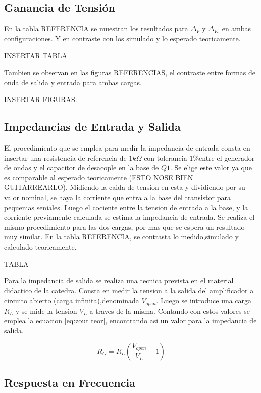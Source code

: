 \subsection{Ganancia de Tensión}

En la tabla REFERENCIA se muestran los resultados para $\Delta_V$ y $\Delta_{Vs}$ en ambas configuraciones. Y en contraste con los simulado y lo esperado teoricamente.

INSERTAR TABLA 

Tambien se observan en las figuras REFERENCIAS, el contraste entre formas de onda de salida y entrada para ambas cargas.

INSERTAR FIGURAS.

\subsection{Impedancias de Entrada y Salida}

El procedimiento que se emplea para medir la impedancia de entrada consta en insertar una resistencia de referencia de $1 k\Omega$ con tolerancia $1\%$entre el generador de ondas y el capacitor de desacople en la base de $Q1$. Se elige este valor ya que es comparable al esperado teoricamente (ESTO NOSE BIEN GUITARREARLO).
Midiendo la caida de tension en esta y dividiendo por su valor nominal, se haya la corriente que entra a la base del transistor para pequenias seniales. Luego el cociente entre la tension de entrada a la base, y la corriente previamente calculada se estima la impedancia de entrada.
Se realiza el mismo procedimiento para las dos cargas, por mas que se espera un resultado muy similar. En la tabla REFERENCIA, se contrasta lo medido,simulado y calculado teoricamente.

TABLA  

Para la impedancia de salida se realiza una tecnica prevista en el material didactico de la catedra. Consta en medir la tension a la salida del amplificador a circuito abierto (carga infinita),denominada $V_{open}$. Luego se introduce una carga $R_L$ y se mide la tension $V_L$ a traves de la misma.
Contando con estos valores se emplea la ecuacion \ref{eq:zout teor}, encontrando asi un valor para la impedancia de salida.

\begin{equation}
    R_O = R_L(\frac{V_{open}}{V_L}-1)
    \label{eq:zout teor}
\end{equation}

\subsection{Respuesta en Frecuencia}

